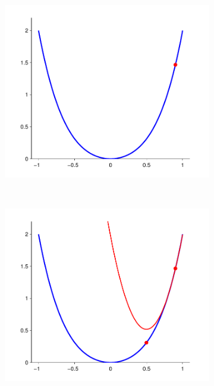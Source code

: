 \begin{figure}
	\begin{subfigure}[b]{0.2\textwidth}
		\includegraphics[width=\textwidth]{./lecture7/Newton0}
	\end{subfigure}
	~
	\begin{subfigure}[b]{0.2\textwidth}
		\includegraphics[width=\textwidth]{./lecture7/Newton1}
	\end{subfigure}
	~
	\begin{subfigure}[b]{0.2\textwidth}

\end{subfigure}
\end{figure}

